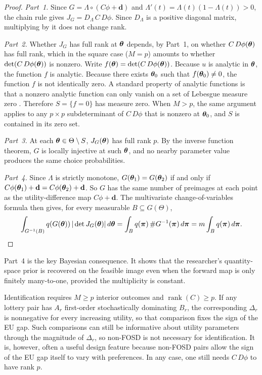\begin{proof}
\textit{Part~1.} Since $G = \Lambda \circ (C\phi + \mathbf{d})$ and
$\Lambda'(t) = \Lambda(t)(1-\Lambda(t)) > 0$, the chain rule gives
$J_G = D_\Lambda\,C\,D\phi$. Since $D_\Lambda$ is a positive
diagonal matrix, multiplying by it does not change rank.

\textit{Part~2.} Whether $J_G$ has full rank at $\boldsymbol{\theta}$
depends, by Part~1, on whether
$C\,D\phi(\boldsymbol{\theta})$ has full rank, which in the square case
($M = p$) amounts to whether
$\det(C\,D\phi(\boldsymbol{\theta}))$ is nonzero. Write
$f(\boldsymbol{\theta}) = \det(C\,D\phi(\boldsymbol{\theta}))$.
Because $u$ is analytic in $\boldsymbol{\theta}$, the function $f$
is analytic. Because there exists $\boldsymbol{\theta}_0$ such that
$f(\boldsymbol{\theta}_0) \neq 0$, the function $f$ is not
identically zero. A standard property of analytic functions is that
a nonzero analytic function can only vanish on a set of Lebesgue
measure zero \parencite{Krantz2002,Mityagin2015}. Therefore
$S = \{f = 0\}$ has measure zero. When $M > p$, the same argument
applies to any $p \times p$ subdeterminant of $C\,D\phi$ that is
nonzero at $\boldsymbol{\theta}_0$, and $S$ is contained in its
zero set.

\textit{Part~3.} At each
$\boldsymbol{\theta} \in \Theta \setminus S$,
$J_G(\boldsymbol{\theta})$ has full rank $p$. By the inverse function
theorem, $G$ is locally injective at such $\boldsymbol{\theta}$, and no
nearby parameter value produces the same choice probabilities.

\textit{Part~4.} Since $\Lambda$ is strictly monotone,
$G(\boldsymbol{\theta}_1) = G(\boldsymbol{\theta}_2)$ if and only if
$C\phi(\boldsymbol{\theta}_1) + \mathbf{d} =
 C\phi(\boldsymbol{\theta}_2) + \mathbf{d}$.
So $G$ has the same number of preimages at each point as the
utility-difference map $C\phi + \mathbf{d}$. The multivariate
change-of-variables formula then gives, for every measurable
$B \subseteq G(\Theta)$,
\begin{equation}
  \int_{G^{-1}(B)}
    q(G(\boldsymbol{\theta}))\,|\det J_G(\boldsymbol{\theta})|\,
    d\boldsymbol{\theta}
  =
  \int_B q(\boldsymbol{\pi})\,\#G^{-1}(\boldsymbol{\pi})\,
    d\boldsymbol{\pi}
  =
  m \int_B q(\boldsymbol{\pi})\,d\boldsymbol{\pi}.
  \qedhere
\end{equation}
\end{proof}

Part~4 is the key Bayesian consequence. It shows that the researcher's
quantity-space prior is recovered on the feasible image even when the forward
map is only finitely many-to-one, provided the multiplicity is constant.

Identification requires $M \geq p$ interior outcomes and
$\operatorname{rank}(C) \geq p$. If any lottery pair has $A_r$
first-order stochastically dominating $B_r$, the corresponding
$\Delta_r$ is nonnegative for every increasing utility, so that
comparison fixes the sign of the EU gap. Such comparisons can still
be informative about utility parameters through the magnitude of
$\Delta_r$, so non-FOSD is not necessary for identification. It is,
however, often a useful design feature because non-FOSD pairs allow
the sign of the EU gap itself to vary with preferences. In any case,
one still needs $C\,D\phi$ to have rank $p$.


